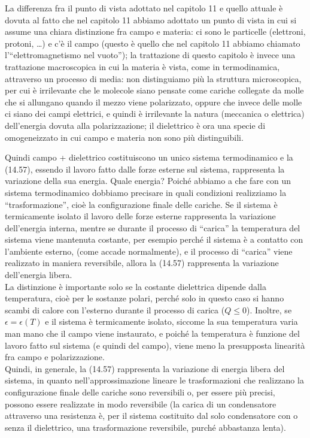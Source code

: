 La differenza fra il punto di vista adottato nel capitolo 11 e quello attuale
\`e dovuta al fatto che nel capitolo 11 abbiamo adottato un punto di vista in
cui si assume una chiara distinzione fra campo e materia: ci sono le particelle
(elettroni, protoni, \dots) e c'\`e il campo (questo \`e quello che nel capitolo
11 abbiamo chiamato l'``elettromagnetismo nel vuoto''); la trattazione di questo
capitolo \`e invece una trattazione macroscopica in cui la materia \`e vista,
come in termodinamica, attraverso un processo di media: non distinguiamo pi\`u
la struttura microscopica, per cui \`e irrilevante che le molecole siano pensate
come cariche collegate da molle che si allungano quando il mezzo viene
polarizzato, oppure che invece delle molle ci siano dei campi elettrici, e
quindi \`e irrilevante la natura (meccanica o elettrica) dell'energia dovuta
alla polarizzazione; il dielettrico \`e ora una specie di omogeneizzato in cui
campo e materia non sono pi\`u distinguibili.

Quindi campo + dielettrico costituiscono un unico sistema termodinamico e la
(14.57), essendo il lavoro fatto dalle forze esterne sul sistema, rappresenta la
variazione della sua energia. Quale energia? Poich\'e abbiamo a che fare con un
sistema termodinamico dobbiamo precisare in quali condizioni realizziamo la
``trasformazione'', cio\`e la configurazione finale delle cariche. Se il sistema
\`e termicamente isolato il lavoro delle forze esterne rappresenta la variazione
dell'energia interna, mentre se durante il processo di ``carica'' la temperatura
del sistema viene mantenuta costante, per esempio perch\'e il sistema \`e a
contatto con l'ambiente esterno, (come accade normalmente), e il processo di
``carica'' viene realizzato in maniera reversibile, allora la (14.57)
rappresenta la variazione dell'energia libera.\\
La distinzione \`e importante solo se la costante dielettrica dipende dalla
temperatura, cio\`e per le sostanze polari, perch\'e solo in questo caso si
hanno scambi di calore con l'esterno durante il processo di carica ($Q\le0$).
Inoltre, se $\epsilon=\epsilon(T)$ e il sistema \`e termicamente isolato,
siccome la sua temperatura varia man mano che il campo viene instaurato, e
poich\'e la temperatura \`e funzione del lavoro fatto sul sistema (e quindi del
campo), viene meno la presupposta linearit\`a fra campo e polarizzazione.\\
Quindi, in generale, la (14.57) rappresenta la variazione di energia libera del
sistema, in quanto nell'approssimazione lineare le trasformazioni che realizzano
la configurazione finale delle cariche sono reversibili o, per essere pi\`u
precisi, possono essere realizzate in modo reversibile (la carica di un
condensatore attraverso una resistenza \`e, per il sistema costituito dal solo
condensatore con o senza il dielettrico, una trasformazione reversibile,
purch\'e abbastanza lenta).

